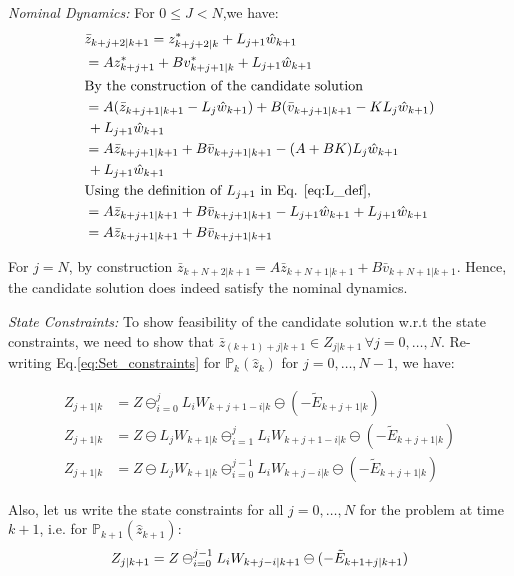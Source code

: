 \textit{ Nominal Dynamics:} For $0\leq J<N$,we have:
\begin{subequations}
\begin{align}
&\bar{z}_{k+j+2|k+1} = z^{*}_{k+j+2|k} + L_{j+1}\hat{w}_{k+1} \\
&= Az^{*}_{k+j+1}+Bv^{*}_{k+j+1|k} + L_{j+1}\hat{w}_{k+1} \\
& \text{By the construction of the candidate solution} \nonumber \\
& = A(\bar{z}_{k+j+1|k+1}-L_j\hat{w}_{k+1}) + B(\bar{v}_{k+j+1|k+1} - KL_j \hat{w}_{k+1}) \nonumber \\
&\, + L_{j+1}\hat{w}_{k+1} \\
& = A\bar{z}_{k+j+1|k+1} + B\bar{v}_{k+j+1|k+1} -(A+BK)L_j\hat{w}_{k+1} \nonumber \\
&\,+ L_{j+1}\hat{w}_{k+1} \\
&\text{Using the definition of $L_{j+1}$ in Eq. \ref{eq:L_def},} \nonumber \\
& = A\bar{z}_{k+j+1|k+1} + B\bar{v}_{k+j+1|k+1} - L_{j+1}\hat{w}_{k+1} + L_{j+1}\hat{w}_{k+1} \\
& = A\bar{z}_{k+j+1|k+1} + B\bar{v}_{k+j+1|k+1}
\end{align}
\end{subequations}

For $j=N$, by construction $\bar{z}_{k+N+2|k+1} = A\bar{z}_{k+N+1|k+1} + B\bar{v}_{k+N+1|k+1}$. Hence, the candidate solution does indeed satisfy the nominal dynamics.

\textit{State Constraints:} To show feasibility of the candidate solution w.r.t the state constraints, we need to show that $\bar{z}_{(k+1)+j|k+1}\in Z_{j|k+1}\, \forall j=0,\dotsc,N$. Re-writing Eq.\ref{eq:Set_constraints} for $\mathbb{P}_{k}(\hat{z}_k)$ for $j=0,\dotsc,N-1$, we have:

\begin{subequations}
\label{eq:redef_Zj}
\begin{align}
Z_{j+1|k} &= Z \ominus_{i=0}^{j}L_iW_{k+j+1-i|k} \ominus (-\tilde{E}_{k+j+1|k}) \\
Z_{j+1|k} &= Z \ominus L_jW_{k+1|k} \ominus_{i=1}^{j}L_iW_{k+j+1-i|k} \ominus (-\tilde{E}_{k+j+1|k})\\
Z_{j+1|k} &= Z \ominus L_jW_{k+1|k} \ominus_{i=0}^{j-1}L_iW_{k+j-i|k} \ominus (-\tilde{E}_{k+j+1|k})
\end{align}
\end{subequations}

Also, let us write the state constraints for all $j=0,\dotsc,N$ for the problem at time $k+1$, i.e. for $\mathbb{P}_{k+1}(\hat{z}_{k+1})$:
\begin{equation}
\label{eq:redef_Zjp1}
Z_{j|k+1} = Z \ominus_{i=0}^{j-1}L_iW_{k+j-i|k+1} \ominus (-\tilde{E}_{k+1+j|k+1}) \\
\end{equation}

